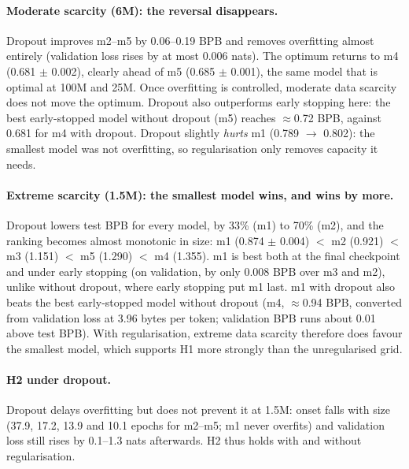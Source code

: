 \documentclass[11pt]{article}
\begin{document}
\paragraph{Moderate scarcity (6M): the reversal disappears.}
Dropout improves m2--m5 by 0.06--0.19 BPB and removes overfitting almost entirely (validation loss rises by at
most 0.006 nats). The optimum returns to m4 (0.681 $\pm$ 0.002), clearly ahead of m5 (0.685 $\pm$ 0.001), the
same model that is optimal at 100M and 25M. Once overfitting is controlled, moderate data scarcity does not
move the optimum. Dropout also outperforms early stopping here: the best early-stopped model without dropout
(m5) reaches $\approx$0.72 BPB, against 0.681 for m4 with dropout. Dropout slightly \emph{hurts} m1
(0.789 $\to$ 0.802): the smallest model was not overfitting, so regularisation only removes capacity it needs.

\paragraph{Extreme scarcity (1.5M): the smallest model wins, and wins by more.}
Dropout lowers test BPB for every model, by 33\% (m1) to 70\% (m2), and the ranking becomes almost monotonic
in size: m1 (0.874 $\pm$ 0.004) $<$ m2 (0.921) $<$ m3 (1.151) $<$ m5 (1.290) $<$ m4 (1.355). m1 is best both at
the final checkpoint and under early stopping (on validation, by only 0.008 BPB over m3 and m2), unlike
without dropout, where early stopping put m1 last.
m1 with dropout also beats the best early-stopped model without dropout (m4, $\approx$0.94 BPB, converted
from validation loss at 3.96 bytes per token; validation BPB runs about 0.01 above test BPB). With
regularisation, extreme data scarcity therefore does favour the smallest model, which supports H1 more strongly
than the unregularised grid.

\paragraph{H2 under dropout.}
Dropout delays overfitting but does not prevent it at 1.5M: onset falls with size (37.9, 17.2, 13.9 and 10.1
epochs for m2--m5; m1 never overfits) and validation loss still rises by 0.1--1.3 nats afterwards. H2 thus holds
with and without regularisation.
\end{document}
